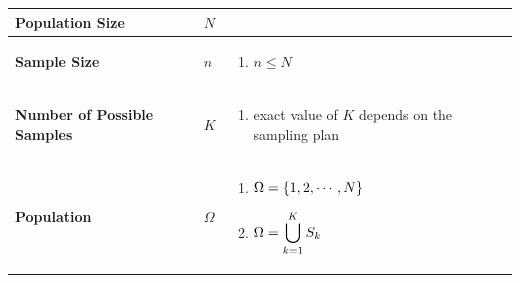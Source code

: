 \begin{customArrayStretch}{1.3}
\begin{longtable}{>{\RaggedRight\arraybackslash}p{4cm} >{\centering\arraybackslash}p{0.5cm} p{10.5cm}}

\hhline{=:=:=} \endfirsthead
\hhline{=:=:=} \endhead
\hhline{=:=:=} \endfoot
\hhline{=:=:=} \endlastfoot


\textbf{Population Size} &
    $N$ &
    \hfill \cite{statistics/book/Statistics-for-Data-Scientists/Maurits-Kaptein}
    \\ \hline

\textbf{Sample Size} &
    $n$ &
    \begin{minipage}{10.3cm}
        \vspace{0.15cm}
        \begin{enumerate}
            \item $n \leq N$
            \hfill \cite{statistics/book/Statistics-for-Data-Scientists/Maurits-Kaptein}
            
        \end{enumerate}
        \vspace{0.15cm}
    \end{minipage} 
    \\ \hline

\textbf{Number of Possible Samples} &
    $K$ &
    \begin{minipage}{10.3cm}
        \vspace{0.15cm}
        \begin{enumerate}
            \item exact value of $K$ depends on the sampling plan
            \hfill \cite{statistics/book/Statistics-for-Data-Scientists/Maurits-Kaptein}
            
        \end{enumerate}
        \vspace{0.15cm}
    \end{minipage} 
    \\ \hline

\textbf{Population} &
    $\Omega$ &
    \begin{minipage}{10.3cm}
        \vspace{0.15cm}
        \begin{enumerate}
            \item $\Omega = \left\{1,2,\cdots,N\right\}$
            \hfill \cite{statistics/book/Statistics-for-Data-Scientists/Maurits-Kaptein}
            
            \item $\Omega = \displaystyle\bigcup_{k=1}^K S_k$
            \hfill \cite{statistics/book/Statistics-for-Data-Scientists/Maurits-Kaptein}
        \end{enumerate}
        \vspace{0.15cm}
    \end{minipage} 
    \\ \hline



\end{longtable}
\end{customArrayStretch}
